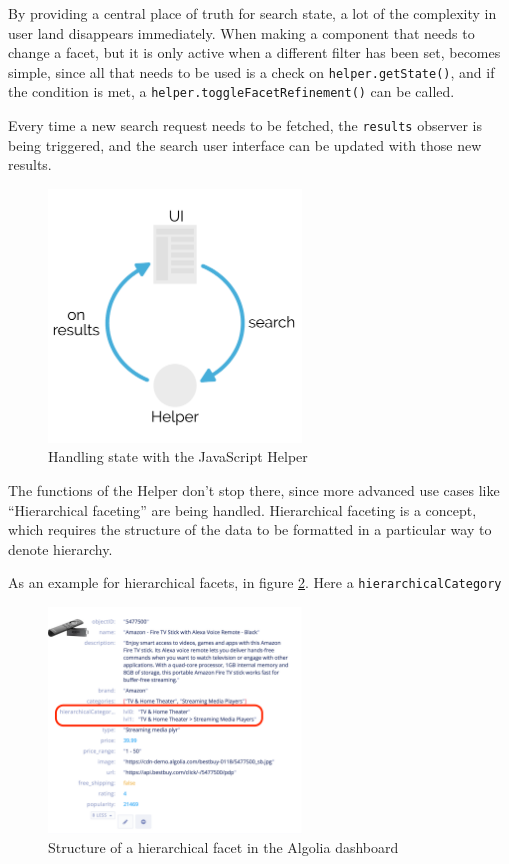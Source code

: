 By providing a central place of truth for search state, a lot of the complexity in user land disappears immediately. When making a component that needs to change a facet, but it is only active when a different filter has been set, becomes simple, since all that needs to be used is a check on {\tt helper.getState()}, and if the condition is met, a {\tt helper.toggleFacetRefinement()} can be called.

Every time a new search request needs to be fetched, the {\tt results} observer is being triggered, and the search user interface can be updated with those new results.

\begin{figure}[H]
  \centering
  \includegraphics[width=0.6\textwidth]{../assets/helper-cycle.pdf}
  \caption{Handling state with the JavaScript Helper\cite{js-helper-concepts}}
  \label{figure:js-helper-state}
\end{figure}

The functions of the Helper don't stop there, since more advanced use cases like ``Hierarchical faceting''\cite{hierarchical-faceting} are being handled. Hierarchical faceting is a concept, which requires the structure of the data to be formatted in a particular way to denote hierarchy. 

As an example for hierarchical facets, in figure \ref{figure:hierarchical-facets}. Here a {\tt hierarchicalCategory} 

\begin{figure}[H]
  \centering
  \includegraphics[width=0.6\textwidth]{../assets/hierarchical-dashboard.png}
  \caption{Structure of a hierarchical facet in the Algolia dashboard}
  \label{figure:hierarchical-facets}
\end{figure}

